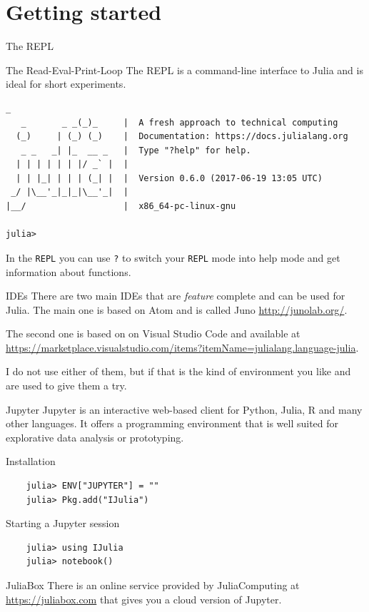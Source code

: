 \documentclass{beamer}
\begin{document}
\section{Getting started}
\begin{frame}[fragile]{The REPL}
  \begin{block}{The Read-Eval-Print-Loop}
    The REPL is a command-line interface to Julia and is ideal for short experiments.
    \begin{Verbatim}[fontsize=\footnotesize]
               _
   _       _ _(_)_     |  A fresh approach to technical computing
  (_)     | (_) (_)    |  Documentation: https://docs.julialang.org
   _ _   _| |_  __ _   |  Type "?help" for help.
  | | | | | | |/ _` |  |
  | | |_| | | | (_| |  |  Version 0.6.0 (2017-06-19 13:05 UTC)
 _/ |\__'_|_|_|\__'_|  |  
|__/                   |  x86_64-pc-linux-gnu

julia> 

\end{Verbatim}

In the \verb|REPL| you can use \verb|?| to switch your \verb|REPL| mode into help mode and get information about functions.
  \end{block}
\end{frame}
\begin{frame}{IDEs}
  There are two main IDEs that are \emph{feature} complete and can be used for Julia. The main one is based on Atom and is called Juno \url{http://junolab.org/}.

\vspace{0.5cm}
  The second one is based on on Visual Studio Code and available at \url{https://marketplace.visualstudio.com/items?itemName=julialang.language-julia}.

\vspace{0.5cm}
  I do not use either of them, but if that is the kind of environment you like and are used to give them a try.
\end{frame}
\begin{frame}[fragile]{Jupyter}
  Jupyter is an interactive web-based client for Python, Julia, R and many other languages.
  It offers a programming environment that is well suited for explorative data analysis or prototyping.
  \begin{block}{Installation}
  \begin{Verbatim}
    julia> ENV["JUPYTER"] = ""
    julia> Pkg.add("IJulia")
    \end{Verbatim}
  \end{block}
  \begin{block}{Starting a Jupyter session}
    \begin{Verbatim}
    julia> using IJulia
    julia> notebook()
    \end{Verbatim}
  \end{block}
  \begin{block}{JuliaBox}
    There is an online service provided by JuliaComputing at \url{https://juliabox.com} that gives you a cloud version of Jupyter.
  \end{block}
\end{frame}
\end{document}
